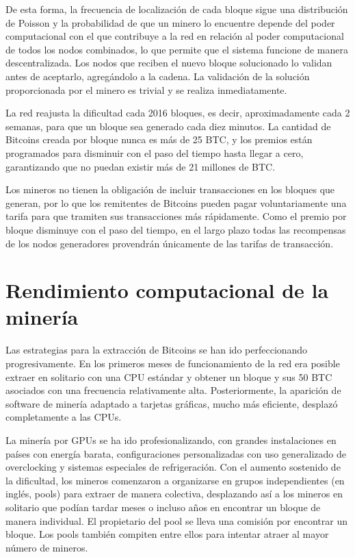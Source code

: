 De esta forma, la frecuencia de localizaci\'on de cada bloque sigue una distribuci\'on de Poisson y la probabilidad de que un minero lo encuentre depende del poder computacional con el que contribuye a la red en relaci\'on al poder computacional de todos los nodos combinados, lo que permite que el sistema funcione de manera descentralizada. Los nodos que reciben el nuevo bloque solucionado lo validan antes de aceptarlo, agreg\'andolo a la cadena. La validaci\'on de la soluci\'on proporcionada por el minero es trivial y se realiza inmediatamente.

La red reajusta la dificultad cada 2016 bloques, es decir, aproximadamente cada 2 semanas, para que un bloque sea generado cada diez minutos. La cantidad de Bitcoins creada por bloque nunca es m\'as de 25 BTC, y los premios est\'an programados para disminuir con el paso del tiempo hasta llegar a cero, garantizando que no puedan existir m\'as de 21 millones de BTC.

Los mineros no tienen la obligaci\'on de incluir transacciones en los bloques que generan, por lo que los remitentes de Bitcoins pueden pagar voluntariamente una tarifa para que tramiten sus transacciones m\'as r\'apidamente. Como el premio por bloque disminuye con el paso del tiempo, en el largo plazo todas las recompensas de los nodos generadores provendr\'an \'unicamente de las tarifas de transacci\'on.


\section{Rendimiento computacional de la miner\'ia}

Las estrategias para la extracci\'on de Bitcoins se han ido perfeccionando progresivamente. En los primeros meses de funcionamiento de la red era posible extraer en solitario con una CPU est\'andar y obtener un bloque y sus 50 BTC asociados con una frecuencia relativamente alta. Posteriormente, la aparici\'on de software de miner\'ia adaptado a tarjetas gr\'aficas, mucho m\'as eficiente, desplaz\'o completamente a las CPUs.

La miner\'ia por GPUs se ha ido profesionalizando, con grandes instalaciones en pa\'ises con energ\'ia barata, configuraciones personalizadas con uso generalizado de overclocking y sistemas especiales de refrigeraci\'on. Con el aumento sostenido de la dificultad, los mineros comenzaron a organizarse en grupos independientes (en ingl\'es, pools) para extraer de manera colectiva, desplazando as\'i a los mineros en solitario que pod\'ian tardar meses o incluso a\~nos en encontrar un bloque de manera individual. El propietario del pool se lleva una comisi\'on por encontrar un bloque. Los pools tambi\'en compiten entre ellos para intentar atraer al mayor n\'umero de mineros.

